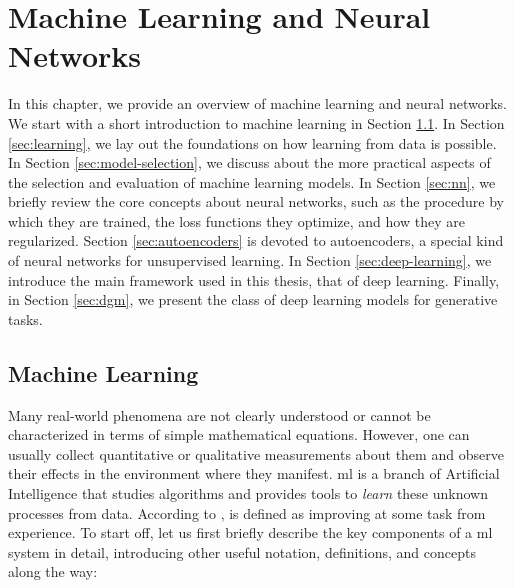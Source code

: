 \chapter{Machine Learning and Neural Networks}\label{ch:neural-networks}
In this chapter, we provide an overview of machine learning and neural networks. We start with a short introduction to machine learning in Section \ref{sec:ml}. In Section \ref{sec:learning}, we lay out the foundations on how learning from data is possible. In Section \ref{sec:model-selection}, we discuss about the more practical aspects of the selection and evaluation of machine learning models. In Section \ref{sec:nn}, we briefly review the core concepts about neural networks, such as the procedure by which they are trained, the loss functions they optimize, and how they are regularized. Section \ref{sec:autoencoders} is devoted to autoencoders, a special kind of neural networks for unsupervised learning. In Section \ref{sec:deep-learning}, we introduce the main framework used in this thesis, that of deep learning. Finally, in Section \ref{sec:dgm}, we present the class of deep learning models for generative tasks.

\section{Machine Learning}\label{sec:ml}
Many real-world phenomena are not clearly understood or cannot be characterized in terms of simple mathematical equations. However, one can usually collect quantitative or qualitative measurements about them and observe their effects in the environment where they manifest. \gls{ml} is a branch of Artificial Intelligence that studies algorithms and provides tools to \emph{learn} these unknown processes from data. According to \citet{mitchell1997ml},  is defined as improving at some task from experience. To start off, let us first briefly describe the key components of a \gls{ml} system in detail, introducing other useful notation, definitions, and concepts along the way:


